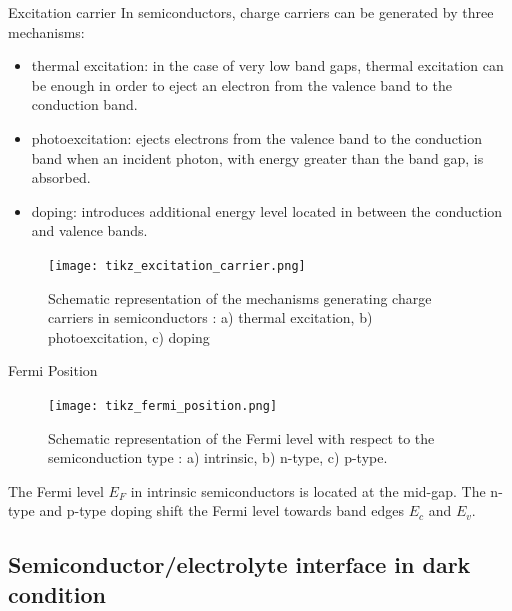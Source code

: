 \documentclass[10pt,compress]{beamer}
\begin{document}
    \begin{frame}[allowframebreaks=1.0]{Excitation carrier}
        In semiconductors, charge carriers can be generated by three mechanisms: 
        \begin{itemize}
            \item thermal excitation: in the case of very low band gaps, thermal excitation can be enough in order 
            to eject an electron from the valence band to the conduction band.
            \item photoexcitation: ejects electrons from the valence band to the conduction 
            band when an incident photon, with energy greater than the band gap, is absorbed.
            \item doping: introduces additional energy level located in between the conduction and 
            valence bands.
        \end{itemize}
        
        \begin{figure}[h]
            \centering
            \texttt{[image: tikz\_excitation\_carrier.png]}
            \caption{Schematic representation of the mechanisms generating charge carriers in semiconductors \citep{finklea1983}: 
            a) thermal excitation, b) photoexcitation, c) doping}
            \label{fig_excitation_carrier}
        \end{figure}
    \end{frame}

    \begin{frame}{Fermi Position}
        \begin{figure}[H]
            \centering
            \texttt{[image: tikz\_fermi\_position.png]}
            \caption{Schematic representation of the Fermi level with respect to the 
            semiconduction type \citep{finklea1983}: a) intrinsic, b) n-type, c) p-type.}
            \label{fig_fermi_position}
        \end{figure}
        The Fermi level $E_F$ in intrinsic semiconductors is located at the mid-gap. 
        The n-type and p-type doping shift the Fermi level towards band edges 
        $E_c$ and $E_v$.
    \end{frame}

\subsection{Semiconductor/electrolyte interface in dark condition}
\end{document}
